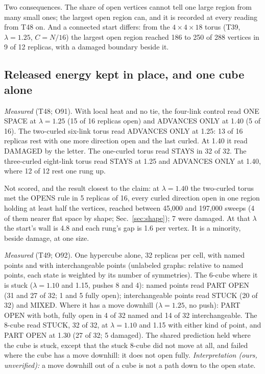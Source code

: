 \documentclass[aps,pre,10pt,twocolumn,superscriptaddress,nofootinbib]{revtex4-2}
\begin{document}
Two consequences. The share of open vertices cannot tell one large region from many small ones; the largest open
region can, and it is recorded at every reading from T48 on. And a connected start differs: from the
$4 \times 4 \times 18$ torus (T39, $\lambda = 1.25$, $C = N/16$) the largest open region reached 186 to 250 of 288
vertices in 9 of 12 replicas, with a damaged boundary beside it.

\subsection{Released energy kept in place, and one cube alone}

\emph{Measured} (T48; O91). With local heat and no tie, the four-link control read ONE SPACE at $\lambda = 1.25$ (15
of 16 replicas open) and ADVANCES ONLY at 1.40 (5 of 16). The two-curled six-link torus read ADVANCES ONLY at 1.25:
13 of 16 replicas rest with one more direction open and the last curled. At 1.40 it read DAMAGED by the letter. The
one-curled torus read STAYS in 32 of 32. The three-curled eight-link torus read STAYS at 1.25 and ADVANCES ONLY at
1.40, where 12 of 12 rest one rung up.

Not scored, and the result closest to the claim: at $\lambda = 1.40$ the two-curled torus met the OPENS rule in 5
replicas of 16, every curled direction open in one region holding at least half the vertices, reached between 45,000
and 197,000 sweeps (4 of them nearer flat space by shape; Sec.~\ref{sec:shape}); 7 were damaged. At that $\lambda$ the start's wall is 4.8 and each rung's gap is 1.6 per vertex.
It is a minority, beside damage, at one size.

\emph{Measured} (T49; O92). One hypercube alone, 32 replicas per cell, with named points and with interchangeable
points (unlabeled graphs: relative to named points, each state is weighted by its number of symmetries). The 6-cube where it is stuck
($\lambda = 1.10$ and 1.15, pushes 8 and 4): named points read PART OPEN (31 and 27 of 32; 1 and 5 fully open);
interchangeable points read STUCK (20 of 32) and MIXED. Where it has a move downhill ($\lambda = 1.25$, no push):
PART OPEN with both, fully open in 4 of 32 named and 14 of 32 interchangeable. The 8-cube read STUCK, 32 of 32, at
$\lambda = 1.10$ and 1.15 with either kind of point, and PART OPEN at 1.30 (27 of 32; 5 damaged). The shared
prediction held where the cube is stuck, except that the stuck 8-cube did not move at all, and failed where the cube
has a move downhill: it does not open fully. \emph{Interpretation (ours, unverified):} a move downhill out of a cube
is not a path down to the open state.
\end{document}
